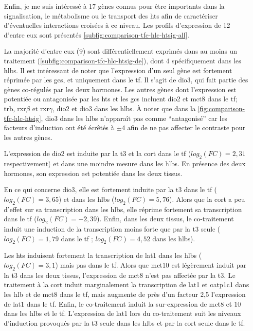 \documentclass[../main.tex]{subfiles}
\begin{document}
	Enfin, je me suis intéressé à 17 gènes connus pour être importants dans la signalisation, le métabolisme ou le transport des \glspl{ht} afin de caractériser d'éventuelles interactions croisées à ce niveau.
	Les profils d'expression de 12 d'entre eux sont présentés \autoref{subfig:comparison-tfc-hlc-htsig-all}.

	

	La majorité d'entre eux (9) sont différentiellement exprimés dans au moins un traitement (\autoref{subfig:comparison-tfc-hlc-htsig-de}), dont 4 spécifiquement dans les \glspl{hlb}.
	Il est intéressant de noter que l'expression d'un seul gène est fortement réprimée par les \glspl{gc}, et uniquement dans le \gls{tf}.
	Il s'agit de \gls{dio3}, qui fait partie des gènes co-régulés par les deux hormones.
	Les autres gènes dont l'expression est potentiée ou antagonisée par les \glspl{ht} et les \glspl{gc} incluent \gls{dio2} et \gls{mct}8 dans le \gls{tf}; \gls{trb}, \gls{rxr}$\beta$ et \gls{rxr}$\gamma$, \gls{dio2} et \gls{dio3} dans les \glspl{hlb}.
	À noter que dans la \autoref{fig:comparison-tfc-hlc-htsig}, \gls{dio3} dans les \glspl{hlb} n’apparaît pas comme ``antagonisé'' car les facteurs d'induction ont été écrêtés à $\pm 4$ afin de ne pas affecter le contraste pour les autres gènes.
	\par
	L'expression de \gls{dio2} est induite par la \gls{t3} et la \gls{cort} dans le \gls{tf} ($log_2(FC)=2,31$ respectivement) et dans une moindre mesure dans les \glspl{hlb}.
	En présence des deux hormones, son expression est potentiée dans les deux tissus.
	\par
	En ce qui concerne \gls{dio3}, elle est fortement induite par la \gls{t3} dans le \gls{tf} ($log_2(FC)=3,65$) et dans les \glspl{hlb} ($log_2(FC)=5,76$).
	Alors que la \gls{cort} a peu d'effet sur sa transcription dans les \glspl{hlb}, elle réprime fortement sa transcription dans le \gls{tf} ($log_2(FC)=-2,39$).
	Enfin, dans les deux tissus, le co-traitement induit une induction de la transcription moins forte que par la \gls{t3} seule ($log_2(FC)=1,79$ dans le \gls{tf} ; $log_2(FC)=4,52$ dans les \glspl{hlb}).
	\par
	Les \glspl{ht} induisent fortement la transcription de \gls{lat}1 dans les \glspl{hlb} ($log_2(FC)=3,1$) mais pas dans le \gls{tf}.
	Alors que \gls{mct}10 est légèrement induit par la \gls{t3} dans les deux tissus, l'expression de \gls{mct}8 n'est pas affectée par la \gls{t3}.
	Le traitement à la \gls{cort} induit marginalement la transcription de \gls{lat}1 et \gls{oatp}1c1 dans les \gls{hlb} et de \gls{mct}8 dans le \gls{tf}, mais augmente de près d'un facteur 2,5 l'expression de \gls{lat}1 dans le \gls{tf}.
	Enfin, le co-traitement induit la sur-expression de \gls{mct}8 et 10 dans les \glspl{hlb} et le \gls{tf}.
	L'expression de \gls{lat}1 lors du co-traitement suit les niveaux d'induction provoqués par la \gls{t3} seule dans les \glspl{hlb} et par la \gls{cort} seule dans le \gls{tf}.

\end{document}
